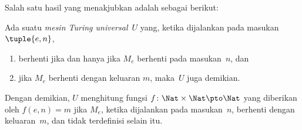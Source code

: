 \documentclass[../../../include/open-logic-section]{subfiles}
\begin{document}
Salah satu hasil yang menakjubkan adalah sebagai berikut:

\begin{thm} Ada suatu \emph{mesin Turing
  universal}~$U$ yang, ketika dijalankan pada masukan $\tuple{e,n}$,
  \begin{enumerate}
    \item berhenti jika dan hanya jika $M_e$ berhenti pada masukan~$n$, dan
    \item jika $M_e$ berhenti dengan keluaran $m$, maka~$U$ juga demikian.
  \end{enumerate}
  Dengan demikian, $U$ menghitung fungsi $f\colon \Nat \times \Nat \pto
  \Nat$ yang diberikan oleh $f(e,n) = m$ jika $M_e$, ketika dijalankan pada
  masukan~$n$, berhenti dengan keluaran~$m$, dan tidak terdefinisi selain itu.
\end{thm}
\end{document}
